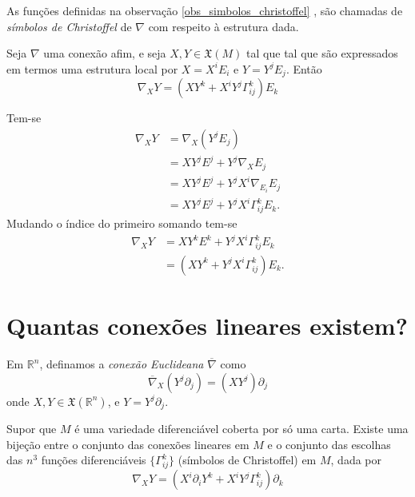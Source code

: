 \begin{definicao} 
	As funções definidas na observação \ref{obs_simbolos_christoffel} , são chamadas de \emph{símbolos de Christoffel} de $\nabla$ com respeito à estrutura dada.
\end{definicao}

\begin{lema}\label{conexiones lineales en función de símbolos de Chritoffel}
	Seja $\nabla$ uma conexão afim, e seja $X,Y \in \mathfrak{X}(M)$ tal que tal que são expressados em termos uma estrutura local por $X = X^i E_i$ e $Y = Y^j E_j$. Então
	\begin{equation*}
		\nabla_X Y = \left( X Y^k + X^i Y^j \Gamma^k_{ij} \right) E_k
	\end{equation*}
\end{lema}

\begin{demonstracao}
	Tem-se
	\begin{align*}
		\nabla_X Y &= \nabla_X (Y^j E_j)\\
		&= X Y^j E^j + Y^j \nabla_X E_j\\
		&= X Y^j E^j + Y^j X^i \nabla_{E_i} E_j\\
		&= X Y^j E^j + Y^j X^i \Gamma^k_{ij} E_k.
	\end{align*}
	Mudando o índice do primeiro somando tem-se
	\begin{align*}
		\nabla_X Y &= X Y^k E^k + Y^j X^i \Gamma^k_{ij} E_k\\
		&= (X Y^k + Y^j X^i \Gamma^k_{ij}) E_k.
	\end{align*}
\end{demonstracao}

\section{Quantas conexões lineares existem?}

\begin{definicao}
	Em $\mathbb{R}^n$, definamos a \emph{conexão Euclideana} $\overline{\nabla}$ como
	\begin{equation*}
		\overline{\nabla}_X \left( Y^j \partial_j \right) = (X Y^j) \partial_j
	\end{equation*}
	onde $X,Y \in \mathfrak{X}(\mathbb{R}^n)$, e $Y = Y^j \partial_j$.
\end{definicao}

\begin{lema}\label{bijecao-entre-a-escolha-dos-simbolos-de-christoffel-e-as-conexoes-lineares}
	Supor que $M$ é uma variedade diferenciável coberta por só uma carta. Existe uma bijeção entre o conjunto das conexões lineares em $M$ e o conjunto das escolhas das $n^3$ funções diferenciáveis $\{ \Gamma^k_{ij} \}$ (símbolos de Christoffel) em $M$, dada por
	\begin{equation*}
		\nabla_X Y = \left( X^i \partial_i Y^k + X^i Y^j \Gamma^k_{ij} \right) \partial_k
	\end{equation*}
\end{lema}


